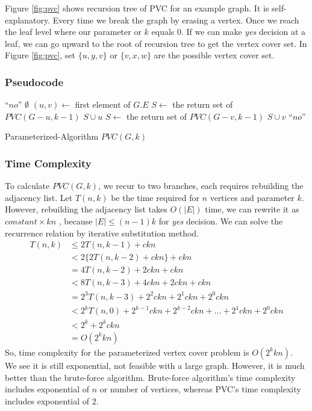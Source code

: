 \documentclass[12pt, a4paper]{article}
\begin{document}
	Figure \ref{fig:pvc} shows recursion tree of PVC for an example graph. It is self-explanatory. Every time we break the graph by erasing a vertex. Once we reach the leaf level where our parameter or $k$ equals 0. If we can make \textit{yes} decision at a leaf, we can go upward to the root of recursion tree to get the vertex cover set. In Figure \ref{fig:pvc}, set $\{u, y, v\}$ or $\{v,x,w\}$ are the possible vertex cover set.
	\subsubsection{Pseudocode}
	\begin{algorithm}[H]
		\SetAlgoLined
		\DontPrintSemicolon
		{
			\Return “$no$”
		}
		{
			\Return $\emptyset$
		}
		$(u,v) \gets $ first element of $G.E$\; 
		{
			$S \gets $ the return set of  $PVC(G-u,k-1)$\;
			\Return $S \cup u$
		}
		{
			$S \gets $ the return set of  $PVC(G-v,k-1)$\;
			\Return $S \cup v$
		}
		\Return “$no$”\;
		\caption{Parameterized-Algorithm $PVC(G, k)$}
	\end{algorithm}
	
	\subsubsection{Time Complexity}
	To calculate $PVC(G,k)$, we recur to two branches, each requires rebuilding the adjacency list. Let $T(n,k)$ be the time required for $n$ vertices and parameter $k$. However, rebuilding the adjacency list takes $O(|E|)$ time, we can rewrite it as $constant \times kn$ , because $|E|\leq(n-1)k$ for \textit{yes} decision. We can solve the recurrence relation by iterative substitution method.
	\begin{align*}
		T(n,k) &\leq 2 T(n,k-1) + ckn \\
		&< 2\{2 T(n,k-2)+ckn\} +ckn \\
		&= 4 T(n,k-2) + 2 ckn + ckn \\
		&< 8 T(n,k-3) + 4 ckn + 2 ckn + ckn \\
		&= 2^3 T(n,k-3) + 2^2 ckn + 2^1 ckn + 2^0 ckn \\
		&< 2^k T(n,0) + 2^{k-1} ckn + 2^{k-2} ckn + ... +2^1 ckn + 2^0 ckn\\
		&< 2^k + 2^k ckn \\
		&= O(2^kkn)
	\end{align*}
	So, time complexity for the parameterized vertex cover problem is $O(2^kkn)$. \\
	We see it is still exponential, not feasible with a large graph. However, it is much better than the brute-force algorithm. Brute-force algorithm's time complexity includes exponential of $n$ or number of vertices, whereas PVC's time complexity includes exponential of $2$.
	\pagebreak
\end{document}
